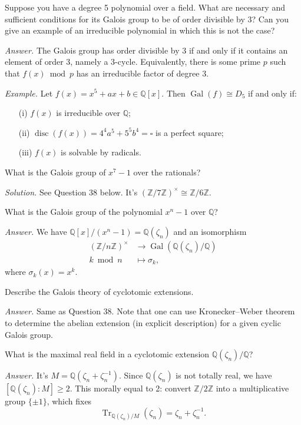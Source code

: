 \documentclass{mathproblems}
\newcommand\Q{\mathbb{Q}}
\newcommand\Z{\mathbb{Z}}
\DeclareMathOperator{\Gal}{Gal}
\DeclareMathOperator{\disc}{disc}
\begin{document}
\begin{questions}
\miquestion
{\color{blue} Suppose you have a degree 5 polynomial over a field. What are necessary and sufficient conditions for its Galois group to be of order divisible by 3? Can you give an example of an irreducible polynomial in which this is not the case?}

\textit{Answer.} The Galois group has order divisible by 3 if and only if it contains an element of order 3, namely a 3-cycle. Equivalently, there is some prime $p$ such that $f(x)\bmod p$ has an irreducible factor of degree 3. 

\textit{Example.} Let $f(x)=x^5+ax+b\in\Q[x]$. Then $\Gal(f)\cong D_5$ if and only if: \vspace{-4pt}
\begin{itemize}
\item[(i)] $f(x)$ is irreducible over $\Q$;

\item[(ii)] $\disc(f(x))=4^4a^5+5^5b^4=\square$ is a perfect square;

\item[(iii)] $f(x)$ is solvable by radicals.
\end{itemize}
\vspace{-4pt}


\miquestion
{\color{blue} What is the Galois group of $x^{7}-1$ over the rationals?}

\textit{Solution.} See Question 38 below. It's $(\Z/7\Z)^\times\cong \Z/6\Z$.

\miquestion
{\color{blue} What is the Galois group of the polynomial $x^{n}-1$ over $\Q$?}

\textit{Answer.} We have $\Q[x]/(x^n-1)=\Q(\zeta_n)$ and an isomorphism
$$
\begin{aligned}
(\Z/n\Z)^\times & \longrightarrow \Gal(\Q(\zeta_n)/\Q) \\
k \bmod n & \longmapsto \sigma_k,
\end{aligned}
$$
where $\sigma_k(x)=x^k$.

\miquestion
{\color{blue} Describe the Galois theory of cyclotomic extensions.}

\textit{Answer.}
Same as Question 38. Note that one can use Kronecker--Weber theorem to determine the abelian extension (in explicit description) for a given cyclic Galois group.

\miquestion
{\color{blue} What is the maximal real field in a cyclotomic extension $\Q(\zeta_{n}) / \Q$?}

\textit{Answer.} It's $M=\Q(\zeta_{n}+\zeta_{n}^{-1})$. Since $\Q(\zeta_{n})$ is not totally real, we have $[\Q(\zeta_{n}):M]\geq 2$. This morally equal to 2: convert $\Z/2\Z$ into a multiplicative group $\{\pm 1\}$, which fixes
$$
\operatorname{Tr}_{\Q(\zeta_{n})/M}(\zeta_n)=\zeta_{n}+\zeta_{n}^{-1}.
$$


\end{questions}
\end{document}

